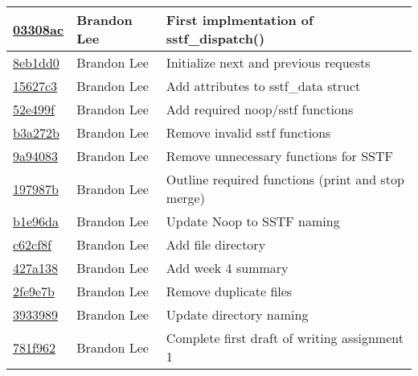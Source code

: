 \documentclass[letterpaper,10pt,titlepage]{article}
\begin{document}
\begin{tabular}{l l l}
\href{https://github.com/brandonlee503/Operating-Systems-II/commit/03308acb7ed33005695d9b27169005beafcf02db}{03308ac} & Brandon Lee & First implmentation of sstf\_dispatch()\\\hline
\href{https://github.com/brandonlee503/Operating-Systems-II/commit/8eb1dd0e8e9d6064272f27dd5bf52af634b6c348}{8eb1dd0} & Brandon Lee & Initialize next and previous requests\\\hline
\href{https://github.com/brandonlee503/Operating-Systems-II/commit/15627c3ad0074838d32a689c5df0b55f1832d91f}{15627c3} & Brandon Lee & Add attributes to sstf\_data struct\\\hline
\href{https://github.com/brandonlee503/Operating-Systems-II/commit/52e499f46f88a6e1104e8a3d8f2c759c525f6d20}{52e499f} & Brandon Lee & Add required noop/sstf functions\\\hline
\href{https://github.com/brandonlee503/Operating-Systems-II/commit/b3a272b869b7a4a75f7fdd8f8f1e3e0938eb8f29}{b3a272b} & Brandon Lee & Remove invalid sstf functions\\\hline
\href{https://github.com/brandonlee503/Operating-Systems-II/commit/9a940838fa9794ced7059dca532962cb5062f580}{9a94083} & Brandon Lee & Remove unnecessary functions for SSTF\\\hline
\href{https://github.com/brandonlee503/Operating-Systems-II/commit/197987b5a31da6c5b1f2dda8918ff01f49f8eae7}{197987b} & Brandon Lee & Outline required functions (print and stop merge)\\\hline
\href{https://github.com/brandonlee503/Operating-Systems-II/commit/b1e96daf6ebc0b733520c55a371824b947841084}{b1e96da} & Brandon Lee & Update Noop to SSTF naming\\\hline
\href{https://github.com/brandonlee503/Operating-Systems-II/commit/c62cf8fd85523293a8979a0f33f3fcf129dfc06c}{c62cf8f} & Brandon Lee & Add file directory\\\hline
\href{https://github.com/brandonlee503/Operating-Systems-II/commit/427a138ecba3b4d3b2076e086fc400a453f1e6b7}{427a138} & Brandon Lee & Add week 4 summary\\\hline
\href{https://github.com/brandonlee503/Operating-Systems-II/commit/2fe9e7be0033bb189532aa1b6ed60368961a9eac}{2fe9e7b} & Brandon Lee & Remove duplicate files\\\hline
\href{https://github.com/brandonlee503/Operating-Systems-II/commit/3933989f88d150178371f5a51df089809001deb3}{3933989} & Brandon Lee & Update directory naming\\\hline
\href{https://github.com/brandonlee503/Operating-Systems-II/commit/781f962c9334215974239d6444f5895159bad253}{781f962} & Brandon Lee & Complete first draft of writing assignment 1\\\hline

\end{tabular}
\end{document}
